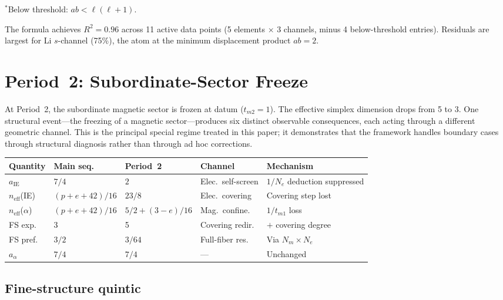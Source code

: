 \documentclass[11pt,a4paper]{article}
\begin{document}
\noindent ${}^*$Below threshold: $ab < \ell(\ell+1)$.

The formula achieves $R^2 = 0.96$ across 11 active data points (5 elements $\times$ 3 channels, minus 4 below-threshold entries). Residuals are largest for Li $s$-channel (75\%), the atom at the minimum displacement product $ab = 2$.

\section{Period~2: Subordinate-Sector Freeze}
\label{sec:period2}

At Period~2, the subordinate magnetic sector is frozen at datum ($t_{m2} = 1$). The effective simplex dimension drops from 5 to 3. One structural event---the freezing of a magnetic sector---produces six distinct observable consequences, each acting through a different geometric channel. This is the principal special regime treated in this paper; it demonstrates that the framework handles boundary cases through structural diagnosis rather than through ad hoc corrections.

\begin{center}
\small
\renewcommand{\arraystretch}{1.15}
\begin{tabular}{llllp{3.2cm}}
\toprule
Quantity & Main seq. & Period~2 & Channel & Mechanism \\
\midrule
$a_{\mathrm{IE}}$ & $7/4$ & $2$ & Elec.\ self-screen & $1/N_e$ deduction suppressed \\
$n_{\mathrm{eff}}$(IE) & $(p{+}e{+}42)/16$ & $23/8$ & Elec.\ covering & Covering step lost \\
$n_{\mathrm{eff}}$($\alpha$) & $(p{+}e{+}42)/16$ & $5/2 + (3{-}e)/16$ & Mag.\ confine. & $1/t_{m1}$ loss \\
FS exp. & 3 & 5 & Covering redir. & $+$ covering degree \\
FS pref. & $3/2$ & $3/64$ & Full-fiber res. & Via $N_m \times N_e$ \\
$a_\alpha$ & $7/4$ & $7/4$ & --- & Unchanged \\
\bottomrule
\end{tabular}
\end{center}

\subsection{Fine-structure quintic}
\end{document}
